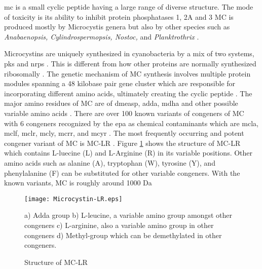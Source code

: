 \gls{mc} is a small cyclic peptide having a large range of diverse structure. The mode of toxicity is its ability to inhibit protein phosphatases 1, 2A and 3 \cite{moore_richard_cyanobacterial_1993} MC is produced mostly by Microcystis genera but also by other species such as \emph{Anabaenopsis, Cylindrospermopsis, Nostoc,} and \emph{Planktrothrix} \cite{rastogi_cyanotoxin-microcystins:_2014, davis_phylogenies_2014}.

Microcystins are uniquely synthesized in cyanobacteria by a mix of two systems, \gls{pks} and  \gls{nrps} \cite{tillett_structural_2000}. This is different from how other proteins are normally synthesized ribosomally . The genetic mechanism of MC synthesis involves multiple protein modules spanning a 48 kilobase pair gene cluster which are responsible for incorporating different amino acids, ultimately creating the cyclic peptide \cite{moffitt_characterization_2004,nishizawa_genetic_1999}. The major amino residues of MC  are of \gls{dmeasp}, \gls{adda},  \gls{mdha} and other possible variable amino acids \cite{trogen_conformational_1996,nishizawa_genetic_1999}.
There are over 100 known variants of congeners of MC with 6 congeners recognized by the \gls{epa} as chemical contaminants which are \gls{mcla}, \gls{mclf}, \gls{mclr}, \gls{mcly}, \gls{mcrr}, and \gls{mcyr} \cite{puddick_modulation_2016}. The most frequently occurring and potent congener variant of MC is MC-LR \cite{rastogi_cyanotoxin-microcystins:_2014}. Figure \ref{fig:structure1} shows the structure of MC-LR which contains L-luecine (L) and L-Arginine (R) in its variable positions. Other amino acids such as alanine (A), tryptophan (W), tyrosine (Y), and phenylalanine (F) can be substituted for other variable congeners.
With the known variants, MC is roughly around 1000 Da \cite{dittmann_cyanobacterial_2012}



 \begin{figure}[t]
   \texttt{[image: Microcystin-LR.eps]}
   \caption{Structure of MC-LR}
   \label{fig:structure1}
   \begin{flushleft}
   a) Adda group
   b) L-leucine, a variable amino group amongst other congeners
   c) L-arginine, also a variable amino group in other congeners
   d) Methyl-group which can be demethylated in other congeners.
     \end{flushleft}

 \end{figure}


